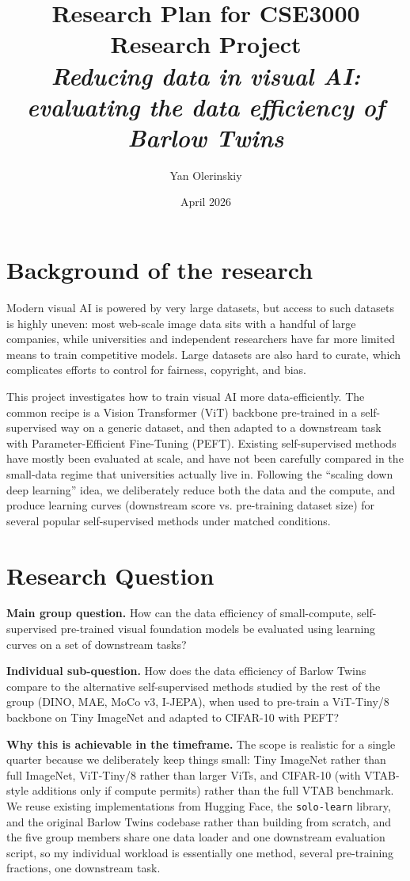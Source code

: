 \documentclass[english, a4paper]{article}
\title{
    Research Plan for CSE3000 Research Project\\
    {\Large \textit{Reducing data in visual AI: evaluating the data efficiency of Barlow Twins}}
}
\author{Yan Olerinskiy}
\date{April 2026}
\begin{document}
\maketitle


\section*{Background of the research}
Modern visual AI is powered by very large datasets, but access to such datasets is highly uneven: most web-scale image data sits with a handful of large companies, while universities and independent researchers have far more limited means to train competitive models. Large datasets are also hard to curate, which complicates efforts to control for fairness, copyright, and bias.

This project investigates how to train visual AI more data-efficiently. The common recipe is a Vision Transformer (ViT) backbone pre-trained in a self-supervised way on a generic dataset, and then adapted to a downstream task with Parameter-Efficient Fine-Tuning (PEFT). Existing self-supervised methods have mostly been evaluated at scale, and have not been carefully compared in the small-data regime that universities actually live in. Following the ``scaling down deep learning'' idea, we deliberately reduce both the data and the compute, and produce learning curves (downstream score vs. pre-training dataset size) for several popular self-supervised methods under matched conditions.

\section*{Research Question}
\textbf{Main group question.} How can the data efficiency of small-compute, self-supervised pre-trained visual foundation models be evaluated using learning curves on a set of downstream tasks?

\textbf{Individual sub-question.} How does the data efficiency of Barlow Twins compare to the alternative self-supervised methods studied by the rest of the group (DINO, MAE, MoCo v3, I-JEPA), when used to pre-train a ViT-Tiny/8 backbone on Tiny ImageNet and adapted to CIFAR-10 with PEFT?

\textbf{Why this is achievable in the timeframe.} The scope is realistic for a single quarter because we deliberately keep things small: Tiny ImageNet rather than full ImageNet, ViT-Tiny/8 rather than larger ViTs, and CIFAR-10 (with VTAB-style additions only if compute permits) rather than the full VTAB benchmark. We reuse existing implementations from Hugging Face, the \texttt{solo-learn} library, and the original Barlow Twins codebase rather than building from scratch, and the five group members share one data loader and one downstream evaluation script, so my individual workload is essentially one method, several pre-training fractions, one downstream task.
\end{document}
